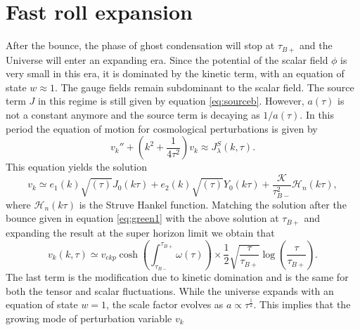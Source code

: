 \documentclass[12pt,a4paper]{article}
\numberwithin{equation}{section}
\numberwithin{equation}{section}
\begin{document}
\section{Fast roll expansion}
\label{sec:fr}
After the bounce, the phase of ghost condensation will stop at $\tau_{B+}$ and the Universe will enter an expanding era. Since the potential of the scalar field $\phi$ is very small in this era, it is dominated by the kinetic term, with an equation of state $w\approx1$. The gauge fields remain subdominant to the scalar field. The source term $J$ in this regime is still given by equation \eqref{eq:sourceb}. However, $a(\tau)$ is not a constant anymore and the source term is decaying as $1/a(\tau)$. 
In this period the equation of motion for cosmological perturbations is given by
\begin{equation}
    v_k''+(k^2+\frac{1}{4\tau^2}) v_k \approx J^S_{\lambda}(k,\tau).
\end{equation}
This equation yields the solution
\begin{equation}
    v_k \simeq e_1(k) \sqrt{(\tau)} J_0(k\tau) + e_2(k) \sqrt{(\tau)} Y_0(k\tau) + \frac{\mathcal{K}}{\tau_{B-}^2}\mathcal{H}_{n}(k\tau),
    \label{eq:kd}
\end{equation}
where $\mathcal{H}_{n}(k\tau)$ is the Struve Hankel function. Matching the solution after the bounce given in equation \eqref{eq:green1} with the above solution at $\tau_{B+}$ and expanding the result at the super horizon limit we obtain that
\begin{equation}
    v_k(k,\tau) \simeq v_{ekp}\cosh(\int_{\tau_{B-}}^{{\tau_{B+}}}\omega(\tau))\times \frac{1}{2}\sqrt{\frac{\tau}{\tau_{B+}}} \log\left(\frac{\tau}{\tau_{B+}}\right).
\end{equation}
The last term is the modification due to kinetic domination and is the same for both the tensor and scalar fluctuations.
While the universe expands
with an equation of state $w = 1$, the scale factor evolves
as  $a \propto \tau^{\frac{1}{2}}$.
This implies that the growing mode of perturbation variable $v_{k}$
\end{document}
